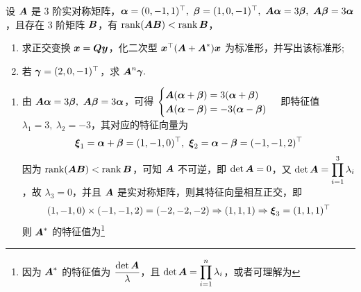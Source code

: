 \begin{example}
    设 $\vb*{A}$ 是 3 阶实对称矩阵，$\vb*{\alpha}=(0,-1,1)^\top,~\vb*{\beta}=(1,0,-1)^\top,~\vb*{A\alpha}=3\vb*{\beta},~\vb*{A\beta}=3\vb*{\alpha}$，且存在 3 阶矩阵 $\vb*{B}$，有 $\rank(\vb*{AB})<\rank\vb*{B}$，
    \begin{enumerate}[label=(\arabic{*})]
        \item 求正交变换 $\vb*{x}=\vb*{Qy}$，化二次型 $\vb*{x}^\top\qty(\vb*{A}+\vb*{A}^*)\vb*{x}$ 为标准形，并写出该标准形;
        \item 若 $\vb*{\gamma}=(2,0,-1)^\top$，求 $\vb*{A}^n\vb*{\gamma}.$
    \end{enumerate}
\end{example}
\begin{solution}
    \begin{enumerate}[label=(\arabic{*})]
        \item 由 $\vb*{A\alpha}=3\vb*{\beta},~\vb*{A\beta}=3\vb*{\alpha}$，可得 $\begin{cases}
                      \vb*{A}(\vb*{\alpha}+\vb*{\beta})=3(\vb*{\alpha}+\vb*{\beta}) \\
                      \vb*{A}(\vb*{\alpha}-\vb*{\beta})=-3(\vb*{\alpha}-\vb*{\beta})
                  \end{cases}$ 即特征值 $\lambda_1=3,~\lambda_2=-3$，其对应的特征向量为 $$\vb*{\xi}_1=\vb*{\alpha}+\vb*{\beta}=(1,-1,0)^\top,~\vb*{\xi}_2=\vb*{\alpha}-\vb*{\beta}=(-1,-1,2)^\top$$
              因为 $\rank(\vb*{AB})<\rank\vb*{B}$，可知 $\vb*{A}$ 不可逆，即 $\det\vb*{A}=0$，又 $\det\vb*{A}=\displaystyle\prod_{i=1}^{3}\lambda_i$，故 $\lambda_3=0$，并且 $\vb*{A}$ 是实对称矩阵，则其特征向量相互正交，即
              $$(1,-1,0)\times(-1,-1,2)=(-2,-2,-2)\Rightarrow (1,1,1)\Rightarrow \vb*{\xi}_3=(1,1,1)^\top$$
              则 $\vb*{A}^*$ 的特征值为\footnote{因为 $\vb*{A}^*$ 的特征值为 $\dfrac{\det\vb*{A}}{\lambda}$，且 $\det\vb*{A}=\displaystyle\prod_{i=1}^{n}\lambda_i$，或者可理解为 }
\end{enumerate}
\end{solution}
